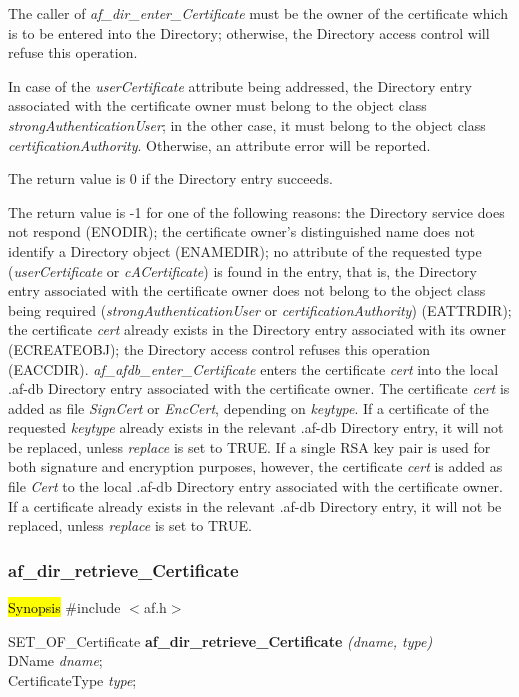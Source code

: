 The caller of {\em af\_dir\_enter\_Certificate} must be the owner of the certificate 
which is to be entered into the Directory; otherwise, the Directory access 
control will refuse this operation.

In case of the {\em userCertificate} attribute being addressed, the Directory entry
associated with the certificate owner must belong to the object class
{\em strongAuthenticationUser}; in the other case, it must belong to the
object class {\em certificationAuthority}. Otherwise, an attribute error will be
reported.

The return value is 0 if the Directory entry succeeds.

The return value is -1 for one of the following reasons:
\bi
\m the Directory service does not respond (ENODIR);
\m the certificate owner's distinguished name does not identify a Directory object (ENAMEDIR);
\m no attribute of the requested type ({\em userCertificate} or {\em cACertificate}) is found 
in the entry, that is, the Directory entry associated with the certificate owner does not
belong to the object class being required ({\em strongAuthenticationUser} or 
{\em certificationAuthority}) (EATTRDIR);
\m the certificate {\em cert} already exists in the Directory entry associated with 
its owner (ECREATEOBJ);
\m the Directory access control refuses this operation (EACCDIR).
\ei
{\em af\_afdb\_enter\_Certificate} enters the certificate {\em cert} into the local .af-db
Directory 
entry associated with the certificate owner. The certificate {\em cert} is added as file {\em SignCert}
or {\em EncCert}, depending on {\em keytype}. If a certificate of the requested {\em keytype} already
exists in the relevant .af-db Directory entry, it will not be replaced, unless {\em replace} is set to TRUE.
If a single RSA key pair is used for both signature and encryption purposes, however, the certificate {\em cert} is added as
file {\em Cert} to the local .af-db Directory entry associated with the certificate owner. If a certificate already
exists in the relevant .af-db Directory entry, it will not be replaced, unless {\em replace} is set to TRUE.



\subsubsection{af\_dir\_retrieve\_Certificate}
\hl{Synopsis}
\#include $<$af.h$>$

SET\_OF\_Certificate {\bf *af\_dir\_retrieve\_Certificate} {\em (dname, type)} \\
DName {\em *dname}; \\
CertificateType {\em type}; 

